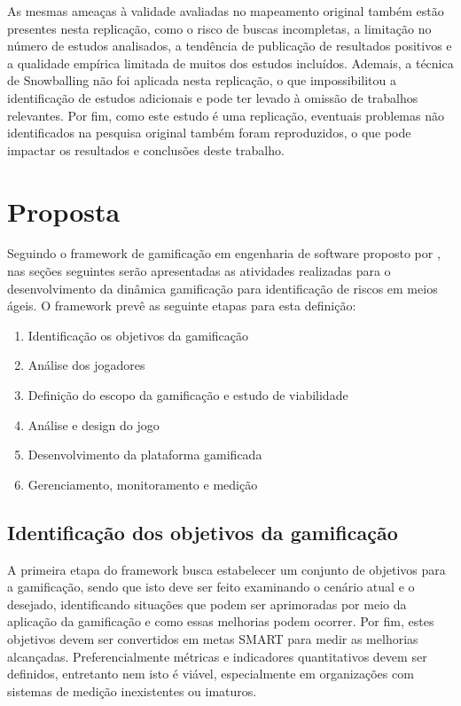 \documentclass[
	12pt,
	openright,
	twoside,
	a4paper,
	english,
	brazil
	]{abntex2}
\begin{document}
As mesmas ameaças à validade avaliadas no mapeamento original também estão presentes nesta replicação, como o risco de buscas incompletas, a limitação no número de estudos analisados, a tendência de publicação de resultados positivos e a qualidade empírica limitada de muitos dos estudos incluídos. Ademais, a técnica de Snowballing não foi aplicada nesta replicação, o que impossibilitou a identificação de estudos adicionais e pode ter levado à omissão de trabalhos relevantes. Por fim, como este estudo é uma replicação, eventuais problemas não identificados na pesquisa original também foram reproduzidos, o que pode impactar os resultados e conclusões deste trabalho.



\chapter{Proposta}

Seguindo o framework de gamificação em engenharia de software proposto por , nas seções seguintes serão apresentadas as atividades realizadas para o desenvolvimento da dinâmica gamificação para identificação de riscos em meios ágeis. O framework prevê as seguinte etapas para esta definição:

\begin{enumerate}
  \item Identificação os objetivos da gamificação  
  \item Análise dos jogadores  
  \item Definição do escopo da gamificação e estudo de viabilidade  
  \item Análise e design do jogo  
  \item Desenvolvimento da plataforma gamificada  
  \item Gerenciamento, monitoramento e medição
\end{enumerate}

\section{Identificação dos objetivos da gamificação}

A primeira etapa do framework busca estabelecer um conjunto de objetivos para a gamificação, sendo que isto deve ser feito examinando o cenário atual e o desejado, identificando situações que podem ser aprimoradas por meio da aplicação da gamificação e como essas melhorias podem ocorrer. Por fim, estes objetivos devem ser convertidos em metas SMART para medir as melhorias alcançadas. Preferencialmente métricas e indicadores quantitativos devem ser definidos, entretanto nem isto é viável, especialmente em organizações com sistemas de medição inexistentes ou imaturos.
\end{document}
